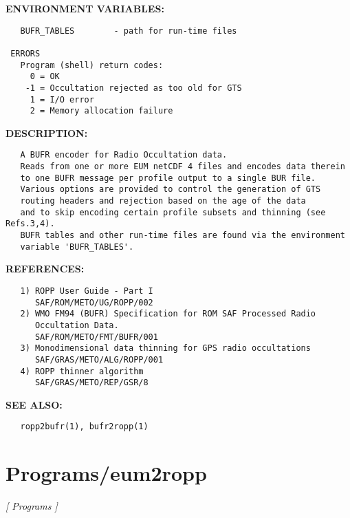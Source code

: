 \textbf{ENVIRONMENT VARIABLES:}\hspace{0.08in}\begin{Verbatim}
   BUFR_TABLES        - path for run-time files

 ERRORS
   Program (shell) return codes:
     0 = OK
    -1 = Occultation rejected as too old for GTS
     1 = I/O error
     2 = Memory allocation failure
\end{Verbatim}
\textbf{DESCRIPTION:}\hspace{0.08in}\begin{Verbatim}
   A BUFR encoder for Radio Occultation data.
   Reads from one or more EUM netCDF 4 files and encodes data therein
   to one BUFR message per profile output to a single BUR file.
   Various options are provided to control the generation of GTS
   routing headers and rejection based on the age of the data
   and to skip encoding certain profile subsets and thinning (see Refs.3,4).
   BUFR tables and other run-time files are found via the environment
   variable 'BUFR_TABLES'.
\end{Verbatim}
\textbf{REFERENCES:}\hspace{0.08in}\begin{Verbatim}
   1) ROPP User Guide - Part I
      SAF/ROM/METO/UG/ROPP/002
   2) WMO FM94 (BUFR) Specification for ROM SAF Processed Radio
      Occultation Data.
      SAF/ROM/METO/FMT/BUFR/001
   3) Monodimensional data thinning for GPS radio occultations
      SAF/GRAS/METO/ALG/ROPP/001
   4) ROPP thinner algorithm
      SAF/GRAS/METO/REP/GSR/8
\end{Verbatim}
\textbf{SEE ALSO:}\hspace{0.08in}\begin{Verbatim}
   ropp2bufr(1), bufr2ropp(1)
\end{Verbatim}
\section{Programs/eum2ropp}
\textsl{[ Programs ]}

